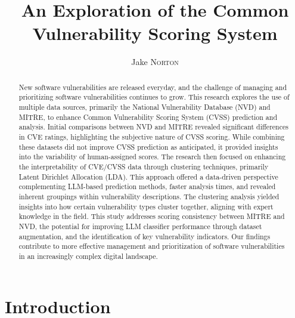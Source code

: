 \documentclass[12pt]{article}
\title{An Exploration of the Common Vulnerability Scoring System}
\author{Jake \textsc{Norton}}
\begin{document}
\maketitle

\begin{abstract}

	New software vulnerabilities are released everyday, and the challenge of managing and prioritizing software vulnerabilities continues to grow. This research explores the use of multiple data sources, primarily the National Vulnerability Database (NVD) and MITRE, to enhance Common Vulnerability Scoring System (CVSS) prediction and analysis. Initial comparisons between NVD and MITRE revealed significant differences in CVE ratings, highlighting the subjective nature of CVSS scoring. While combining these datasets did not improve CVSS prediction as anticipated, it provided insights into the variability of human-assigned scores. The research then focused on enhancing the interpretability of CVE/CVSS data through clustering techniques, primarily Latent Dirichlet Allocation (LDA). This approach offered a data-driven perspective complementing LLM-based prediction methods, faster analysis times, and revealed inherent groupings within vulnerability descriptions. The clustering analysis yielded insights into how certain vulnerability types cluster together, aligning with expert knowledge in the field. This study addresses scoring consistency between MITRE and NVD, the potential for improving LLM classifier performance through dataset augmentation, and the identification of key vulnerability indicators. Our findings contribute to more effective management and prioritization of software vulnerabilities in an increasingly complex digital landscape.

\end{abstract}


\section{Introduction}
\end{document}
